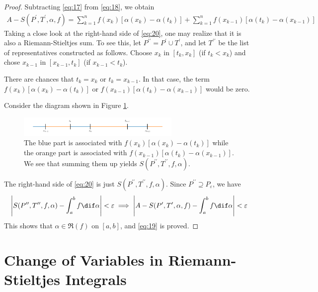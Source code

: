 \documentclass[thmcnt=section, color=blue, 12pt]{my-elegantbook}
\begin{document}
\begin{proof}
	Subtracting \eqref{eq:17} from \eqref{eq:18}, we obtain
	\begin{align}
		A - S(P^\prime, T^\prime, \alpha, f)
		= \sum_{k=1}^n f(x_k) [ \alpha(x_k) - \alpha(t_k) ]
		+ \sum_{k=1}^n f(x_{k-1}) [ \alpha(t_k) - \alpha(x_{k-1}) ]
		\label{eq:20}
	\end{align}
	Taking a close look at the right-hand side of \eqref{eq:20},
	one may realize that it is also a Riemann-Stieltjes sum.
	To see this, let $P^{\prime\prime} = P^\prime \cup T^\prime$,
	and let $T^{\prime\prime}$ be the list of representatives constructed as follows.
	Choose $x_k$ in $[t_k, x_k]$ (if $t_k < x_k$)
	and chose $x_{k-1}$ in $[x_{k-1}, t_k]$ (if $x_{k-1} < t_k$).
	\begin{note}
		There are chances that $t_k = x_k$ or $t_k = x_{k-1}$.
		In that case, the term $f(x_k)[\alpha(x_k)-\alpha(t_k)]$
		or $f(x_{k-1})[\alpha(t_k)-\alpha(x_{k-1})]$
		would be zero.
	\end{note}

	Consider the diagram shown in Figure \ref{fig:5}.
	\begin{figure}[H]
		\centering
		\includegraphics[width=0.7\textwidth]{figures/integration-by-parts-proof-diagram.png}
		\caption{The blue part is associated with $f(x_k)[\alpha(x_k)-\alpha(t_k)]$ while the orange part is associated with $f(x_{k-1})[\alpha(t_k)-\alpha(x_{k-1})]$. We see that summing them up yields $S(P^{\prime\prime}, T^{\prime\prime}, f, \alpha)$.}
		\label{fig:5}
	\end{figure}

	The right-hand side of \eqref{eq:20}
	is just $S(P^{\prime\prime}, T^{\prime\prime}, f, \alpha)$.
	Since $P^{\prime\prime} \supseteq P_\varepsilon$,
	we have
	\begin{align*}
		\abs{
			S(P^{\prime\prime}, T^{\prime\prime}, f, \alpha)
			- \int_a^b f \dif \alpha
		} < \varepsilon
		\implies \abs{
			A - S(P^\prime, T^\prime, \alpha, f) -  \int_a^b f \dif \alpha
		} < \varepsilon
	\end{align*}
	This shows that $\alpha \in \mathfrak{R}(f)$ on $[a, b]$,
	and \eqref{eq:19} is proved.
\end{proof}

\section{Change of Variables in Riemann-Stieltjes Integrals}
\end{document}
